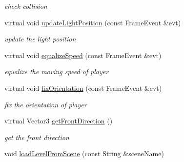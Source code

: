 \begin{DoxyCompactItemize}
\begin{DoxyCompactList}\small\item\em check collision \end{DoxyCompactList}\item 
virtual void \hyperlink{class_basic_tutorial__00_ab5e701d1142693b4404ce672444e0f14}{update\+Light\+Position} (const Frame\+Event \&evt)\hypertarget{class_basic_tutorial__00_ab5e701d1142693b4404ce672444e0f14}{}\label{class_basic_tutorial__00_ab5e701d1142693b4404ce672444e0f14}

\begin{DoxyCompactList}\small\item\em update the light position \end{DoxyCompactList}\item 
virtual void \hyperlink{class_basic_tutorial__00_abfe0cf98461d76fc3e9be5b417f0d94f}{equalize\+Speed} (const Frame\+Event \&evt)\hypertarget{class_basic_tutorial__00_abfe0cf98461d76fc3e9be5b417f0d94f}{}\label{class_basic_tutorial__00_abfe0cf98461d76fc3e9be5b417f0d94f}

\begin{DoxyCompactList}\small\item\em equalize the moving speed of player \end{DoxyCompactList}\item 
virtual void \hyperlink{class_basic_tutorial__00_aea14b000cfa10783029c299420220cfe}{fix\+Orientation} (const Frame\+Event \&evt)\hypertarget{class_basic_tutorial__00_aea14b000cfa10783029c299420220cfe}{}\label{class_basic_tutorial__00_aea14b000cfa10783029c299420220cfe}

\begin{DoxyCompactList}\small\item\em fix the orientation of player \end{DoxyCompactList}\item 
virtual Vector3 \hyperlink{class_basic_tutorial__00_a5a67f94bedcf0049a718b5c325f33c42}{get\+Front\+Direction} ()\hypertarget{class_basic_tutorial__00_a5a67f94bedcf0049a718b5c325f33c42}{}\label{class_basic_tutorial__00_a5a67f94bedcf0049a718b5c325f33c42}

\begin{DoxyCompactList}\small\item\em get the front direction \end{DoxyCompactList}\item 
void \hyperlink{class_basic_tutorial__00_a6f332c7915c0419f355cd901a69999b1}{load\+Level\+From\+Scene} (const String \&scene\+Name)\hypertarget{class_basic_tutorial__00_a6f332c7915c0419f355cd901a69999b1}{}\label{class_basic_tutorial__00_a6f332c7915c0419f355cd901a69999b1}


\end{DoxyCompactItemize}
